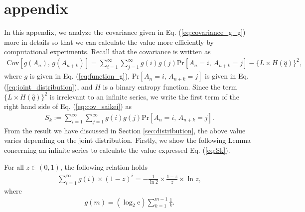 \newpage
\section{appendix}\label{appendix:1}
In this appendix, we analyze the covariance given in Eq. (\ref{eq:covariance_g_g}) more in details so that we can calculate the value more efficiently by computational experiments. Recall that the covariance is written as 
\begin{align}\label{eq:cov_saikei}
	\mathrm{Cov}[g(A_n),\, g(A_{n+k})] 
	= \sum_{i=1}^{\infty} \sum_{j=1}^{\infty} g(i) g(j) \mathrm{Pr} \left[ A_n=i,\,A_{n+k}=j \right] - \{L\times H(\hat{q})\}^2,
\end{align}
where $g$ is given in Eq. (\ref{eq:function_g}), $\mathrm{Pr} \left[ A_n=i,\,A_{n+k}=j \right]$ is given in Eq. (\ref{eq:joint_distribution}), and $H$ is a binary entropy function.
%
Since the term $\{L\times H(\hat{q})\}^2$ is irrelevant to an infinite series, we write the first term of the right hand side of Eq. (\ref{eq:cov_saikei}) as
%
%
\begin{align}\label{eq:Sk}
	S_{k} := \sum_{i=1}^{\infty} \sum_{j=1}^{\infty} g(i) g(j) \mathrm{Pr} \left[ A_n=i,\,A_{n+k}=j \right].
\end{align}
From the result we have discussed in Section \ref{sec:distribution}, the above value varies depending on the joint distribution.
%
Firstly, we show the following Lemma concerning an infinite series to calculate the value expressed Eq. (\ref{eq:Sk}). 
%
\begin{lemma}\label{lemma:1}
For all $z \in (0,1)$, the following relation holds
\begin{align}\label{eq:infinite_series}
	\sum_{i=1}^{\infty} g(i) \times (1-z)^i = -\frac{1}{\ln 2} \times \frac{1-z}{z} \times \ln z,
\end{align}
where
\begin{align}
	g(m) = (\log_2 \mathrm{e}) \sum_{k=1}^{m-1} \frac{1}{k}.
\end{align}
\end{lemma}
%
